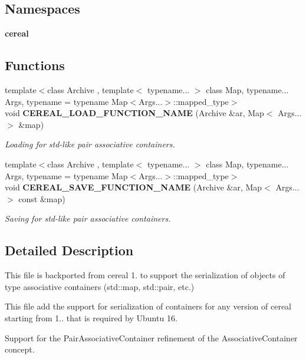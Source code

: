 \subsection*{Namespaces}
\begin{DoxyCompactItemize}
\item 
 \textbf{ cereal}
\end{DoxyCompactItemize}
\subsection*{Functions}
\begin{DoxyCompactItemize}
\item 
{\footnotesize template$<$class Archive , template$<$ typename... $>$ class Map, typename... Args, typename  = typename Map$<$\+Args...$>$\+::mapped\+\_\+type$>$ }\\void \textbf{ C\+E\+R\+E\+A\+L\+\_\+\+L\+O\+A\+D\+\_\+\+F\+U\+N\+C\+T\+I\+O\+N\+\_\+\+N\+A\+ME} (Archive \&ar, Map$<$ Args... $>$ \&map)
\begin{DoxyCompactList}\small\item\em Loading for std-\/like pair associative containers. \end{DoxyCompactList}\item 
{\footnotesize template$<$class Archive , template$<$ typename... $>$ class Map, typename... Args, typename  = typename Map$<$\+Args...$>$\+::mapped\+\_\+type$>$ }\\void \textbf{ C\+E\+R\+E\+A\+L\+\_\+\+S\+A\+V\+E\+\_\+\+F\+U\+N\+C\+T\+I\+O\+N\+\_\+\+N\+A\+ME} (Archive \&ar, Map$<$ Args... $>$ const \&map)
\begin{DoxyCompactList}\small\item\em Saving for std-\/like pair associative containers. \end{DoxyCompactList}\end{DoxyCompactItemize}


\subsection{Detailed Description}
This file is backported from cereal 1. to support the serialization of objects of type associative containers (std\+::map, std\+::pair, etc.) 

This file add the support for serialization of containers for any version of cereal starting from 1.. that is required by Ubuntu 16.

Support for the Pair\+Associative\+Container refinement of the Associative\+Container concept. 